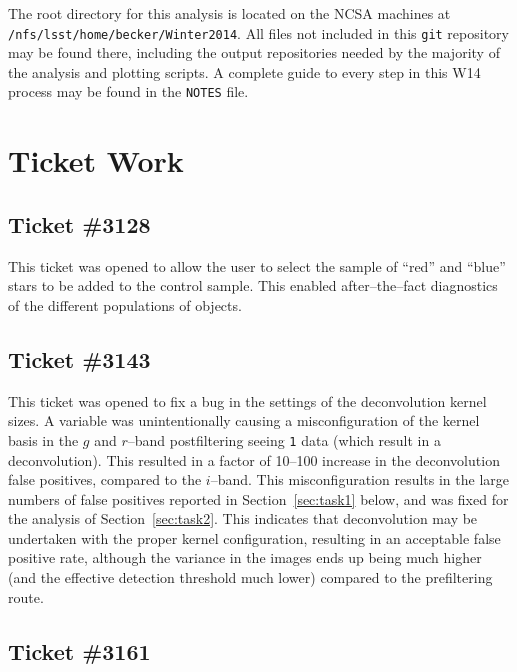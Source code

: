 \documentclass[prd, nofootinbib, floatfix, 11pt, tightenlines, times]{article}
\begin{document}
\clearpage



\clearpage
\begin{appendices}

The root directory for this analysis is located on the NCSA machines
at \\{\tt /nfs/lsst/home/becker/Winter2014}.  All files not included in
this {\tt git} repository may be found there, including the output
repositories needed by the majority of the analysis and plotting
scripts.  A complete guide to every step in this W14 process may be
found in the {\tt NOTES} file.

\section{Ticket Work}

\subsection{Ticket \#3128 \label{sec:3128}}

This ticket was opened to allow the user to select the sample of
``red'' and ``blue'' stars to be added to the control sample.  This
enabled after--the--fact diagnostics of the different populations of
objects.

\subsection{Ticket \#3143 \label{sec:3143}}

This ticket was opened to fix a bug in the settings of the
deconvolution kernel sizes.  A variable was unintentionally causing a
misconfiguration of the kernel basis in the $g$ and $r$--band
postfiltering seeing {\tt 1} data (which result in a deconvolution).
This resulted in a factor of 10--100 increase in the deconvolution
false positives, compared to the $i$--band.  This misconfiguration
results in the large numbers of false positives reported in
Section~\ref{sec:task1} below, and was fixed for the analysis of
Section~\ref{sec:task2}.  This indicates that deconvolution may be
undertaken with the proper kernel configuration, resulting in an
acceptable false positive rate, although the variance in the images
ends up being much higher (and the effective detection threshold much
lower) compared to the prefiltering route.

\subsection{Ticket \#3161 \label{sec:3161}}


\end{appendices}
\end{document}
